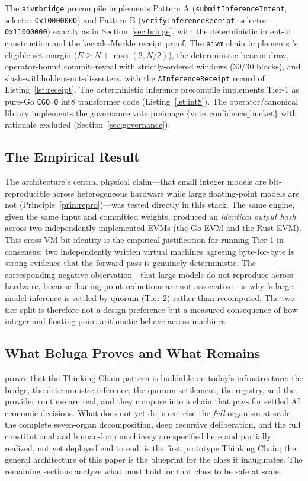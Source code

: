 The \texttt{aivmbridge} precompile implements Pattern A (\texttt{submitInferenceIntent}, selector \texttt{0x10000000}) and Pattern B (\texttt{verifyInferenceReceipt}, selector \texttt{0x11000000}) exactly as in Section~\ref{sec:bridge}, with the deterministic intent-id construction and the keccak--Merkle receipt proof. The \texttt{aivm} chain implements \SCC{}'s eligible-set margin ($E \ge N + \max(2, N/2)$), the deterministic beacon draw, operator-bound commit--reveal with strictly-ordered windows ($30/30$ blocks), and slash-withholders-not-dissenters, with the \texttt{AInferenceReceipt} record of Listing~\ref{lst:receipt}. The deterministic inference precompile implements Tier-1 as pure-Go \texttt{CGO=0} int8 transformer code (Listing~\ref{lst:int8}). The operator/canonical library implements the governance vote preimage $\{\text{vote}, \text{confidence\_bucket}\}$ with rationale excluded (Section~\ref{sec:governance}).

\subsection{The Empirical Result}

The architecture's central physical claim---that small integer models are bit-reproducible across heterogeneous hardware while large floating-point models are not (Principle~\ref{prin:repro})---was tested directly in this stack. The same engine, given the same input and committed weights, produced an \emph{identical output hash} across two independently implemented EVMs (the Go EVM and the Rust EVM). This cross-VM bit-identity is the empirical justification for running Tier-1 in consensus: two independently written virtual machines agreeing byte-for-byte is strong evidence that the forward pass is genuinely deterministic. The corresponding negative observation---that large models do not reproduce across hardware, because floating-point reductions are not associative---is why \Beluga{}'s large-model inference is settled by quorum (Tier-2) rather than recomputed. The two-tier split is therefore not a design preference but a measured consequence of how integer and floating-point arithmetic behave across machines.

\subsection{What Beluga Proves and What Remains}

\Beluga{} proves that the Thinking Chain pattern is buildable on today's infrastructure: the bridge, the deterministic inference, the quorum settlement, the registry, and the provider runtime are real, and they compose into a chain that pays for settled AI economic decisions. What \Beluga{} does not yet do is exercise the \emph{full} organism at scale---the complete seven-organ decomposition, deep recursive deliberation, and the full constitutional and human-loop machinery are specified here and partially realized, not yet deployed end to end. \Beluga{} is the first prototype Thinking Chain; the general architecture of this paper is the blueprint for the class it inaugurates. The remaining sections analyze what must hold for that class to be safe at scale.

